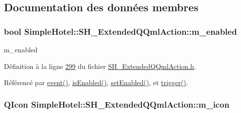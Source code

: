 \subsection{Documentation des données membres}
\hypertarget{classSimpleHotel_1_1SH__ExtendedQQmlAction_a412f551872a7daf02e03336740e7d74e}{
\subsubsection[{m\-\_\-enabled}]{\setlength{\rightskip}{0pt plus 5cm}bool Simple\-Hotel\-::\-S\-H\-\_\-\-Extended\-Q\-Qml\-Action\-::m\-\_\-enabled\hspace{0.3cm}{\ttfamily [private]}}}\label{classSimpleHotel_1_1SH__ExtendedQQmlAction_a412f551872a7daf02e03336740e7d74e}


m\-\_\-enabled 



Définition à la ligne \hyperlink{SH__ExtendedQQmlAction_8h_source_l00299}{299} du fichier \hyperlink{SH__ExtendedQQmlAction_8h_source}{S\-H\-\_\-\-Extended\-Q\-Qml\-Action.\-h}.



Référencé par \hyperlink{classSimpleHotel_1_1SH__ExtendedQQmlAction_af9f8858833e85282453c40556706b52a}{event()}, \hyperlink{classSimpleHotel_1_1SH__ExtendedQQmlAction_a9b2338d14913efb8b97d9f43bd9396f9}{is\-Enabled()}, \hyperlink{classSimpleHotel_1_1SH__ExtendedQQmlAction_affecbd383cbf070f6c70c0e4e021d696}{set\-Enabled()}, et \hyperlink{classSimpleHotel_1_1SH__ExtendedQQmlAction_ac7d4cb7950d71bad70dfe0fd3930f7f8}{trigger()}.

\hypertarget{classSimpleHotel_1_1SH__ExtendedQQmlAction_ae750e9357ebb9599138b8f33e5dc4c74}{
\subsubsection[{m\-\_\-icon}]{\setlength{\rightskip}{0pt plus 5cm}Q\-Icon Simple\-Hotel\-::\-S\-H\-\_\-\-Extended\-Q\-Qml\-Action\-::m\-\_\-icon\hspace{0.3cm}{\ttfamily [private]}}}\label{classSimpleHotel_1_1SH__ExtendedQQmlAction_ae750e9357ebb9599138b8f33e5dc4c74}


